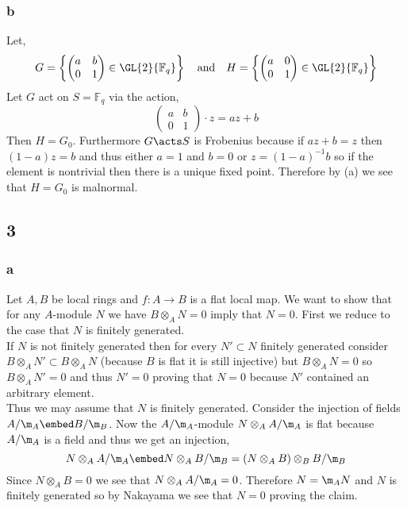\documentclass[12pt]{article}
\renewcommand{\F}{\mathbb{F}}
\begin{document}
\subsubsection{b}

Let,
\[ G = \left\{ \begin{pmatrix}
a & b 
\\
0 & 1 
\end{pmatrix} \in \GL{2}{\F_q} \right\} \quad \text{and} \quad H = \left \{ 
\begin{pmatrix}
a & 0 
\\
0 & 1
\end{pmatrix} \in \GL{2}{\F_q} \right\} \]
Let $G$ act on $S = \F_q$ via the action,
\[ \begin{pmatrix}
a & b 
\\
0 & 1
\end{pmatrix}
\cdot z = a z + b \]
Then $H = G_0$. Furthermore $G \acts S$ is Frobenius because if $a z + b = z$ then $(1 - a)z = b$ and thus either $a = 1$ and $b = 0$ or $z = (1 - a)^{-1} b$ so if the element is nontrivial then there is a unique fixed point. Therefore by (a) we see that $H = G_0$ is malnormal. 

\subsection{3}

\subsubsection{a}

Let $A, B$ be local rings and $f : A \to B$ is a flat local map. We want to show that for any $A$-module $N$ we have $B \otimes_A N = 0$ imply that $N = 0$. First we reduce to the case that $N$ is finitely generated.
\bigskip\\
If $N$ is not finitely generated then for every $N' \subset N$ finitely generated consider $B \otimes_A N' \subset B \otimes_A N$ (because $B$ is flat it is still injective) but $B \otimes_A N = 0$ so $B \otimes_A N' = 0$ and thus $N' = 0$ proving that $N = 0$ because $N'$ contained an arbitrary element. 
\bigskip\\
Thus we may assume that $N$ is finitely generated. Consider the injection of fields $A / \m_A \embed B / \m_B$. Now the $A/ \m_A$-module $N \otimes_A A / \m_A$ is flat because $A / \m_A$ is a field and thus we get an injection,
\[ N \otimes_A A / \m_A \embed N \otimes_A B / \m_B = (N \otimes_A B) \otimes_B B / \m_B \]
Since $N \otimes_A B = 0$ we see that $N \otimes_A A / \m_A = 0$. Therefore $N = \m_A N$ and $N$ is finitely generated so by Nakayama we see that $N = 0$ proving the claim.
\end{document}
